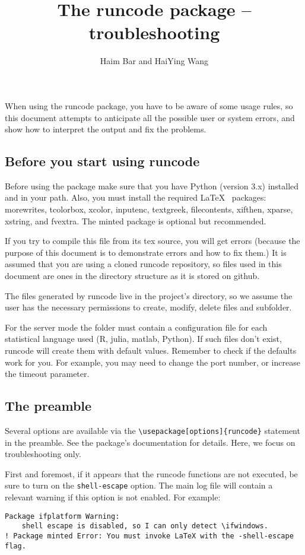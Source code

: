 \documentclass[a4paper,10pt]{article}
\title{The runcode package -- troubleshooting}
\author{Haim Bar and HaiYing Wang}
\begin{document}
\maketitle

When using the runcode package, you have to be aware of some usage rules, so this document attempts to anticipate all the possible user or system errors, and show how to interpret the output and fix the problems.

\subsection*{Before you start using runcode}

Before using the package make sure that you have Python (version 3.x) installed and in your path. Also, you must install the required \LaTeX~ packages: 
morewrites, tcolorbox, xcolor, inputenc, textgreek, filecontents, xifthen, xparse, xstring, and fvextra. The minted package is optional but recommended.

If you try to compile this file from its tex source, you will get errors (because the purpose of this document is to demonstrate errors and how to fix them.) It is assumed that you are using a cloned runcode repository, so files used in this document are ones in the directory structure as it is stored on github.

The files generated by runcode live in the project's directory, so we assume the user has the necessary permissions to create, modify, delete files and subfolder.

For the server mode the folder must contain a configuration file for each statistical language used (R, julia, matlab, Python). If such files don't exist, runcode will create them with default values. Remember to check if the defaults work for you. For example, you may need to change the port number, or increase the timeout parameter.


\subsection*{The preamble}
Several options are available via the \verb|\usepackage[options]{runcode}| statement in the preamble. See the package's documentation for details. Here, we focus on troubleshooting only.

First and foremost, if it appears that the runcode functions are not executed, be sure to turn on the \verb|shell-escape| option. The main log file will contain a relevant warning if this option is not enabled. For example:
\begin{Verbatim}
Package ifplatform Warning: 
    shell escape is disabled, so I can only detect \ifwindows.
! Package minted Error: You must invoke LaTeX with the -shell-escape flag.
\end{Verbatim}
\end{document}
